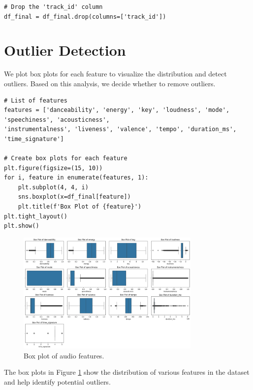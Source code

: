 \begin{verbatim}
# Drop the 'track_id' column
df_final = df_final.drop(columns=['track_id'])
\end{verbatim}

\section{Outlier Detection}

We plot box plots for each feature to visualize the distribution and detect outliers. Based on this analysis, we decide whether to remove outliers.

\begin{verbatim}
# List of features
features = ['danceability', 'energy', 'key', 'loudness', 'mode', 'speechiness', 'acousticness', 
'instrumentalness', 'liveness', 'valence', 'tempo', 'duration_ms', 'time_signature']
    
# Create box plots for each feature
plt.figure(figsize=(15, 10))
for i, feature in enumerate(features, 1):
    plt.subplot(4, 4, i)
    sns.boxplot(x=df_final[feature])
    plt.title(f'Box Plot of {feature}')
plt.tight_layout()
plt.show()
\end{verbatim}

\newpage

\begin{figure}[h]
    \centering
    \includegraphics[width=0.8\textwidth]{media/outlier.png} 
    \caption{Box plot of audio features.}
    \label{box_plot}
\end{figure}


The box plots in Figure \ref{box_plot} show the distribution of various features in the dataset and help identify potential outliers.

